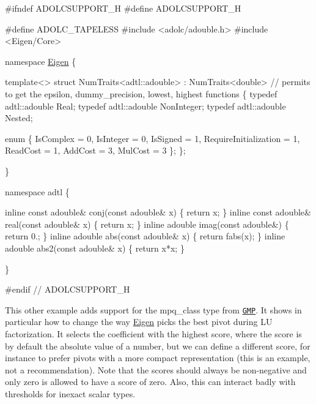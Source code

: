 \begin{DoxyCode}
\textcolor{preprocessor}{#ifndef ADOLCSUPPORT\_H}
\textcolor{preprocessor}{#define ADOLCSUPPORT\_H}

\textcolor{preprocessor}{#define ADOLC\_TAPELESS}
\textcolor{preprocessor}{#include <adolc/adouble.h>}
\textcolor{preprocessor}{#include <Eigen/Core>}

\textcolor{keyword}{namespace }\hyperlink{namespace_eigen}{Eigen} \{

\textcolor{keyword}{template}<> \textcolor{keyword}{struct }NumTraits<adtl::adouble>
 : NumTraits<double> \textcolor{comment}{// permits to get the epsilon, dummy\_precision, lowest, highest functions}
\{
  \textcolor{keyword}{typedef} adtl::adouble Real;
  \textcolor{keyword}{typedef} adtl::adouble NonInteger;
  \textcolor{keyword}{typedef} adtl::adouble Nested;

  \textcolor{keyword}{enum} \{
    IsComplex = 0,
    IsInteger = 0,
    IsSigned = 1,
    RequireInitialization = 1,
    ReadCost = 1,
    AddCost = 3,
    MulCost = 3
  \};
\};

\}

\textcolor{keyword}{namespace }adtl \{

\textcolor{keyword}{inline} \textcolor{keyword}{const} adouble& conj(\textcolor{keyword}{const} adouble& x)  \{ \textcolor{keywordflow}{return} x; \}
\textcolor{keyword}{inline} \textcolor{keyword}{const} adouble& real(\textcolor{keyword}{const} adouble& x)  \{ \textcolor{keywordflow}{return} x; \}
\textcolor{keyword}{inline} adouble imag(\textcolor{keyword}{const} adouble&)    \{ \textcolor{keywordflow}{return} 0.; \}
\textcolor{keyword}{inline} adouble abs(\textcolor{keyword}{const} adouble&  x)  \{ \textcolor{keywordflow}{return} fabs(x); \}
\textcolor{keyword}{inline} adouble abs2(\textcolor{keyword}{const} adouble& x)  \{ \textcolor{keywordflow}{return} x*x; \}

\}

\textcolor{preprocessor}{#endif // ADOLCSUPPORT\_H}
\end{DoxyCode}


This other example adds support for the {\ttfamily mpq\+\_\+class} type from \href{https://gmplib.org/}{\tt G\+MP}. It shows in particular how to change the way \hyperlink{namespace_eigen}{Eigen} picks the best pivot during LU factorization. It selects the coefficient with the highest score, where the score is by default the absolute value of a number, but we can define a different score, for instance to prefer pivots with a more compact representation (this is an example, not a recommendation). Note that the scores should always be non-\/negative and only zero is allowed to have a score of zero. Also, this can interact badly with thresholds for inexact scalar types.


